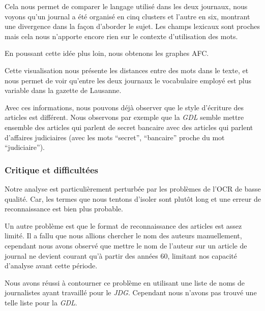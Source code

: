 Cela nous permet de comparer le langage utilisé dans les deux journaux,
nous voyons qu'un journal a été organisé en cinq clusters et l'autre en
six, montrant une divergence dans la façon d'aborder le sujet. Les
champs lexicaux sont proches mais cela nous n'apporte encore rien sur le
contexte d'utilisation des mots.

En poussant cette idée plus loin, nous obtenons les graphes AFC.

Cette visualisation nous présente les distances entre des mots dans le
texte, et nous permet de voir qu'entre les deux journaux le vocabulaire
employé est plus variable dans la gazette de Lausanne.

Avec ces informations, nous pouvons déjà observer que le style
d'écriture des articles est différent. Nous observons par exemple que la
\emph{GDL} semble mettre ensemble des articles qui parlent de secret
bancaire avec des articles qui parlent d'affaires judiciaires (avec les
mots ``secret'', ``bancaire'' proche du mot ``judiciaire'').

\hypertarget{critique-et-difficultuxe9es}{%
\subsubsection{Critique et
difficultées}\label{critique-et-difficultuxe9es}}

Notre analyse est particulièrement perturbée par les problèmes de l'OCR
de basse qualité. Car, les termes que nous tentons d'isoler sont plutôt
long et une erreur de reconnaissance est bien plus probable.

Un autre problème est que le format de reconnaissance des articles est
assez limité. Il a fallu que nous allions chercher le nom des auteurs
manuellement, cependant nous avons observé que mettre le nom de l'auteur
sur un article de journal ne devient courant qu'à partir des années 60,
limitant nos capacité d'analyse avant cette période.

Nous avons réussi à contourner ce problème en utilisant une liste de
noms de journalistes ayant travaillé pour le \emph{JDG}. Cependant nous
n'avons pas trouvé une telle liste pour la \emph{GDL}.

